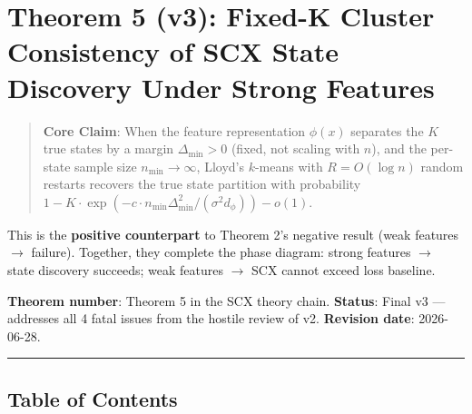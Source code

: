 \documentclass[
  12pt,
]{ctexart}
\author{SCX}
\date{2026}
\begin{document}
\section{Theorem 5 (v3): Fixed-K Cluster Consistency of SCX State
Discovery Under Strong
Features}\label{theorem-5-v3-fixed-k-cluster-consistency-of-scx-state-discovery-under-strong-features}

\begin{quote}
\textbf{Core Claim}: When the feature representation \(\phi(x)\)
separates the \(K\) true states by a margin \(\Delta_{\min} > 0\)
(fixed, not scaling with \(n\)), and the per-state sample size
\(n_{\min} \to \infty\), Lloyd's \(k\)-means with \(R = O(\log n)\)
random restarts recovers the true state partition with probability
\(1 - K \cdot \exp(-c \cdot n_{\min} \Delta_{\min}^2 / (\sigma^2 d_\phi)) - o(1)\).
\end{quote}

This is the \textbf{positive counterpart} to Theorem 2's negative result
(weak features \(\to\) failure). Together, they complete the phase
diagram: strong features \(\to\) state discovery succeeds; weak features
\(\to\) SCX cannot exceed loss baseline.

\textbf{Theorem number}: Theorem 5 in the SCX theory chain.
\textbf{Status}: Final v3 --- addresses all 4 fatal issues from the
hostile review of v2. \textbf{Revision date}: 2026-06-28.

\begin{center}\rule{0.5\linewidth}{0.5pt}\end{center}

\subsection{Table of Contents}\label{table-of-contents}
\end{document}
